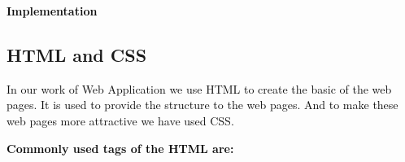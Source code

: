 \documentclass[12pt]{report}
\renewcommand{\_}{\kern-1.5pt\textunderscore\kern-1.5pt}
\begin{document}

\par


\vspace{\baselineskip}

\vspace{\baselineskip}

\vspace{\baselineskip}

\vspace{\baselineskip}
\begin{adjustwidth}{0.3in}{0.84in}
{\fontsize{20pt}{24.0pt}\selectfont \textbf{\textcolor[HTML]{0D0D0D}{ \tab \tab \tab \tab \tab \tab \tab \tab  }}{\fontsize{24pt}{28.8pt}\selectfont \textbf{\textcolor[HTML]{0D0D0D}{Implementation}}\par}\par}\par

\end{adjustwidth}


\vspace{\baselineskip}

\vspace{\baselineskip}
\vspace{\baselineskip}

\vspace{\baselineskip}
\subsection{HTML and CSS}

\vspace{\baselineskip}
\begin{adjustwidth}{0.3in}{0.84in}
\textcolor[HTML]{0D0D0D}{In our work of Web Application we use HTML to create the basic of the web pages. It is used to provide the structure to the web pages. And to make these web pages more attractive we have used CSS. }\par

\end{adjustwidth}


\vspace{\baselineskip}
\begin{adjustwidth}{0.3in}{0.84in}
\textbf{\textcolor[HTML]{0D0D0D}{Commonly used tags of the HTML are:}}\par

\end{adjustwidth}
\end{document}
